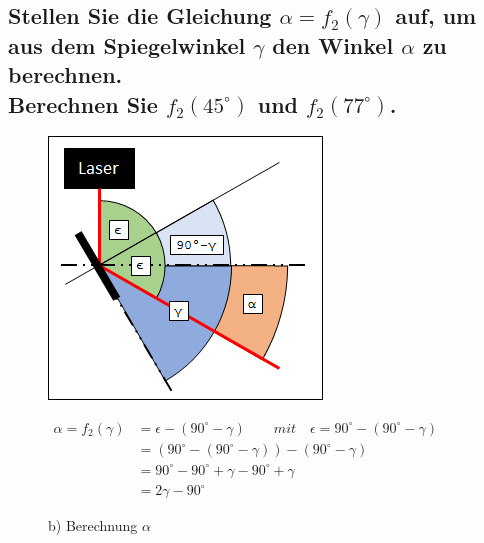 \documentclass[a4paper,10pt,DIV=14]{scrartcl}
\newcommand{\dg}[1]{#1^\circ}
\begin{document}
\subsection{Stellen Sie die Gleichung $\alpha = f_2(\gamma)$ auf, um aus dem Spiegelwinkel $\gamma$ den Winkel $\alpha$ zu berechnen. \\ Berechnen Sie $f_2(45^\circ)$ und $f_2(77^\circ)$.}


\begin{figure}[H]
	\begin{minipage}[c]{0.49\textwidth}
		\centering						
		\includegraphics[width=.95\linewidth]{alpha.png}
	\end{minipage}
	\hfill
	\begin{minipage}[c]{0.49\textwidth}
		\centering
		$ \begin{aligned}
			\alpha = f_2(\gamma) & = \epsilon - (\dg{90} - \gamma) \qquad \textit{mit} \quad \epsilon = \dg{90} - (\dg{90} - \gamma) \\
			       & = (\dg{90} - (\dg{90} - \gamma)) - (\dg{90} - \gamma) \\
		           & = \dg{90} - \dg{90} + \gamma - \dg{90} + \gamma \\
		           & = 2\gamma - \dg{90}
		\end{aligned} $
	\end{minipage}
	\caption*{b) Berechnung $\alpha$}
\end{figure}
\end{document}
